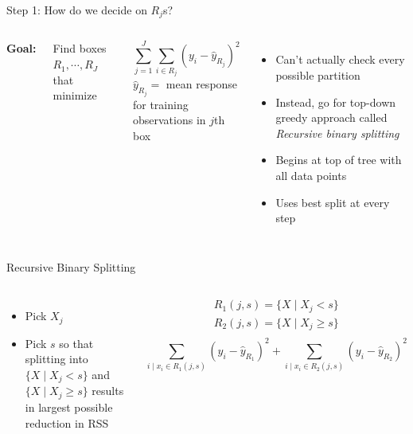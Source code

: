 \documentclass[aspectratio=169,usenames,dvipsnames]{beamer}
\newcommand{\InstructorList}[1]{
\begin{itemize}
	\color{orange}
	#1
\end{itemize}
}
\begin{document}
\begin{frame}[c]{Step 1: How do we decide on $R_j$s?}

\begin{columns}
\centering
\textbf{Goal:}

Find boxes $R_1,\cdots,R_J$ that minimize

\begin{equation*}
	\sum_{j=1}^J \sum_{i \in R_j} (y_i-\hat y_{R_j})^2
\end{equation*}
$\hat y_{R_j} = $ mean response for training observations in $j$th box

\centering
\InstructorList{
  \item Can't actually check every possible partition
	\item Instead, go for top-down greedy approach called \textit{Recursive binary splitting}
	\item Begins at top of tree with all data points
	\item Uses best split at every step
}

\end{columns}

\end{frame}
\begin{frame}[t]{Recursive Binary Splitting}

\begin{columns}
\centering
\begin{itemize}
	\item Pick $X_j$
  \item Pick $s$ so that splitting into $\{X \mid X_j < s\}$ and $\{X \mid X_j \geq s\}$ results in largest possible reduction in RSS
\end{itemize}
\centering
\begin{align*}
	R_1(j,s) = \{X \mid X_j < s\}\\
	R_2(j,s) = \{X \mid X_j \geq s\}\\
\end{align*}
\begin{equation*}
	\sum_{i \mid x_i \in R_1(j,s)}(y_i - \hat y _{R_1})^2
	+
	\sum_{i \mid x_i \in R_2(j,s)}(y_i - \hat y _{R_2})^2
\end{equation*}
\end{columns}

\end{frame}
\end{document}
